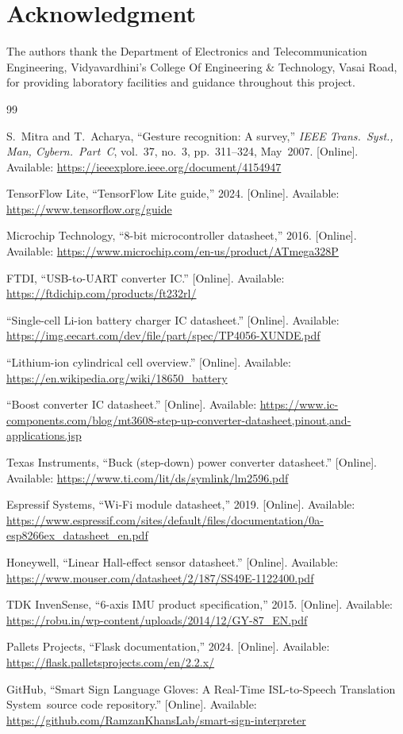 \documentclass[conference]{IEEEtran}
\newcommand{\SystemName}{Smart Sign Language Gloves: A Real-Time ISL-to-Speech Translation System}
\newcommand{\InstituteName}{Vidyavardhini's College Of Engineering \& Technology, Vasai Road}
\newcommand{\DeptName}{Department of Electronics and Telecommunication Engineering}
\newcommand{\CodeRepoUrl}{https://github.com/RamzanKhansLab/smart-sign-interpreter}
\begin{document}
\section*{Acknowledgment}

The authors thank the \DeptName, \InstituteName, for providing laboratory
facilities and guidance throughout this project.

\balance

\begin{thebibliography}{99}

S.~Mitra and T.~Acharya,
``Gesture recognition: A survey,''
\textit{IEEE Trans.\ Syst., Man, Cybern.\ Part~C},
vol.~37, no.~3, pp.~311--324, May~2007.
[Online]. Available: \url{https://ieeexplore.ieee.org/document/4154947}

TensorFlow Lite,
``TensorFlow Lite guide,'' 2024.
[Online]. Available: \url{https://www.tensorflow.org/guide}

Microchip Technology,
``8-bit microcontroller datasheet,'' 2016.
[Online]. Available: \url{https://www.microchip.com/en-us/product/ATmega328P}

FTDI, ``USB-to-UART converter IC.''
[Online]. Available: \url{https://ftdichip.com/products/ft232rl/}

``Single-cell Li-ion battery charger IC datasheet.''
[Online]. Available:
\url{https://img.eecart.com/dev/file/part/spec/TP4056-XUNDE.pdf}

``Lithium-ion cylindrical cell overview.''
[Online]. Available: \url{https://en.wikipedia.org/wiki/18650_battery}

``Boost converter IC datasheet.''
[Online]. Available:
\url{https://www.ic-components.com/blog/mt3608-step-up-converter-datasheet,pinout,and-applications.jsp}

Texas Instruments,
``Buck (step-down) power converter datasheet.''
[Online]. Available: \url{https://www.ti.com/lit/ds/symlink/lm2596.pdf}

Espressif Systems,
``Wi-Fi module datasheet,'' 2019.
[Online]. Available:
\url{https://www.espressif.com/sites/default/files/documentation/0a-esp8266ex_datasheet_en.pdf}

Honeywell,
``Linear Hall-effect sensor datasheet.''
[Online]. Available:
\url{https://www.mouser.com/datasheet/2/187/SS49E-1122400.pdf}

TDK InvenSense,
``6-axis IMU product specification,'' 2015.
[Online]. Available:
\url{https://robu.in/wp-content/uploads/2014/12/GY-87_EN.pdf}

Pallets Projects,
``Flask documentation,'' 2024.
[Online]. Available: \url{https://flask.palletsprojects.com/en/2.2.x/}

GitHub, ``\SystemName\ source code repository.''
[Online]. Available: \url{\CodeRepoUrl}

\end{thebibliography}
\end{document}
